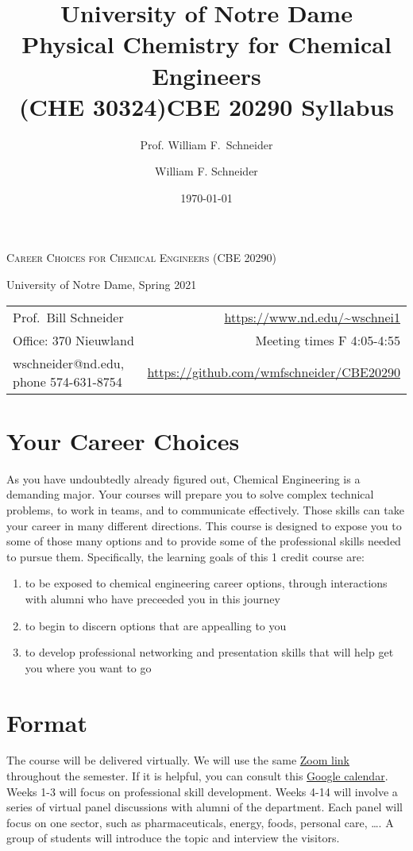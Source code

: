 \documentclass[11pt]{article}
\title{University of Notre Dame\\Physical Chemistry for Chemical Engineers\\(CHE 30324)}
\author{Prof. William F.\ Schneider}
\author{William F. Schneider}
\date{\today}
\title{CBE 20290  Syllabus}
\begin{document}
\begin{OPTIONS}
\end{OPTIONS}

\begin{center}
\textsc{Career Choices for Chemical Engineers (CBE 20290)}

University of Notre Dame, Spring 2021
\end{center}

\begin{center}
\begin{tabular}{lr}
\hline
Prof.~Bill Schneider & \url{https://www.nd.edu/\~wschnei1}\\
Office: 370 Nieuwland & Meeting times F 4:05-4:55\\
wschneider@nd.edu, phone 574-631-8754 & \url{https://github.com/wmfschneider/CBE20290}\\
\hline
\end{tabular}
\end{center}

\section{Your Career Choices}
\label{sec:orgc77752d}
As you have undoubtedly already figured out, Chemical Engineering is a demanding major. Your courses will prepare you to solve complex technical problems, to work in teams, and to communicate effectively.  Those skills can take your career in many different directions. This course is designed to expose you to some of those many options and to provide some of the professional skills needed to pursue them. Specifically, the learning goals of this 1 credit course are:

\begin{enumerate}
\item to be exposed to chemical engineering career options, through interactions with alumni who have preceeded you in this journey
\item to begin to discern options that are appealling to you
\item to develop  professional networking and presentation skills that will help get you where you want to go
\end{enumerate}

\section{Format}
\label{sec:org338bed7}
The course will be delivered virtually. We will use the same \href{https://notredame.zoom.us/j/91572218330?pwd=WFFvRW9DU3UvMHhXUTBwQUNIZzd0dz09}{Zoom link} throughout the semester. If it is helpful, you can consult this \href{https://calendar.google.com/calendar/u/0?cid=Y183NG02cDJnYWQ2NDQ4OTUzZGthaHJia2Nnc0Bncm91cC5jYWxlbmRhci5nb29nbGUuY29t}{Google calendar}.  Weeks 1-3 will focus on professional skill development. Weeks 4-14 will involve a series of virtual panel discussions with alumni of the department. Each panel will focus on one sector, such as pharmaceuticals, energy, foods, personal care, \ldots.  A group of students will introduce the topic and interview the visitors.
\end{document}
